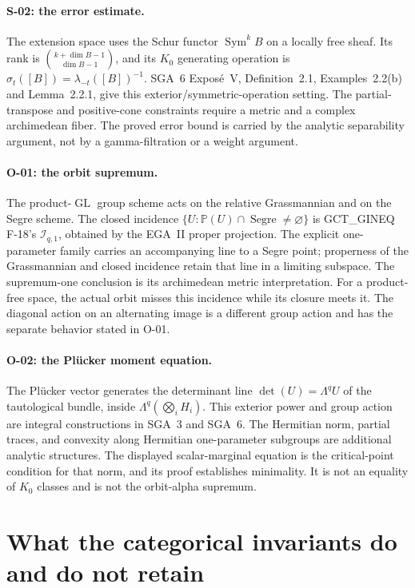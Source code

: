 \paragraph{S-02: the error estimate.}
The extension space uses the Schur functor
$\operatorname{Sym}^k B$ on a locally free sheaf.
Its rank is $\binom{k+\dim B-1}{\dim B-1}$, and its
$K_0$ generating operation is
$\sigma_t([B])=\lambda_{-t}([B])^{-1}$.
SGA~6 Expos\'e~V, Definition~2.1, Examples~2.2(b)
and Lemma~2.2.1, give this exterior/symmetric-operation
setting. The partial-transpose and positive-cone
constraints require a metric and a complex
archimedean fiber. The proved error bound is carried
by the analytic separability argument, not by a
gamma-filtration or a weight argument.

\paragraph{O-01: the orbit supremum.}
The product-$\operatorname{GL}$ group scheme acts on
the relative Grassmannian and on the Segre scheme.
The closed incidence
$\{U:\mathbb P(U)\cap\operatorname{Segre}\ne\varnothing\}$
is GCT\_GINEQ F-18's $\mathcal I_{q,1}$, obtained by
the EGA~II proper projection. The explicit
one-parameter family carries an accompanying line
to a Segre point; properness of the Grassmannian
and closed incidence retain that line in a limiting
subspace. The supremum-one conclusion is its
archimedean metric interpretation. For a product-free
space, the actual orbit misses this incidence while
its closure meets it. The diagonal action on an
alternating image is a different group action and
has the separate behavior stated in O-01.

\paragraph{O-02: the Pl\"ucker moment equation.}
The Pl\"ucker vector generates the determinant line
$\det(U)=\Lambda^q U$ of the tautological bundle,
inside $\Lambda^q(\bigotimes_i H_i)$. This exterior
power and group action are integral constructions
in SGA~3 and SGA~6. The Hermitian norm, partial
traces, and convexity along Hermitian one-parameter
subgroups are additional analytic structures.
The displayed scalar-marginal equation is the
critical-point condition for that norm, and its
proof establishes minimality. It is not an equality
of $K_0$ classes and is not the orbit-alpha supremum.

\section{What the categorical invariants do and do not retain}

